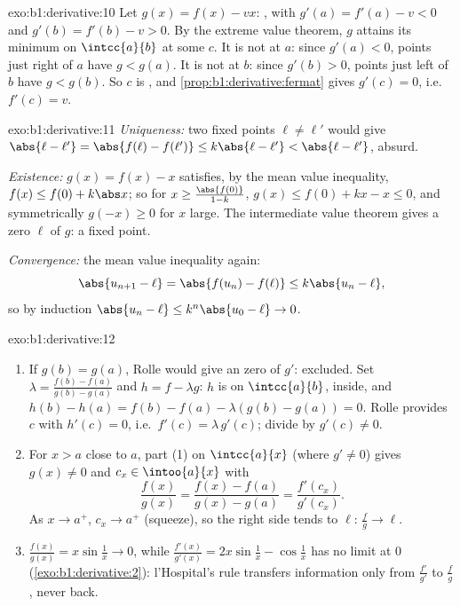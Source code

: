 \begin{solution}{exo:b1:derivative:10}
Let $g(x) = f(x) - vx$: , with $g'(a) = f'(a) - v < 0$
and $g'(b) = f'(b) - v > 0$. By the extreme value theorem, $g$
attains its minimum on $\intcc{a}{b}$ at some $c$. It is not at $a$:
since $g'(a) < 0$, points just right of $a$ have $g < g(a)$. It is
not at $b$: since $g'(b) > 0$, points just left of $b$ have $g <
g(b)$. So $c$ is , and \cref{prop:b1:derivative:fermat}
gives $g'(c) = 0$, i.e.\ $f'(c) = v$.
\end{solution}

\begin{solution}{exo:b1:derivative:11}
\emph{Uniqueness:} two fixed points $\ell \neq \ell'$ would give
$\abs{\ell - \ell'} = \abs{f(\ell) - f(\ell')} \leq k\abs{\ell -
\ell'} < \abs{\ell - \ell'}$, absurd.

\emph{Existence:} $g(x) = f(x) - x$ satisfies, by the mean value
inequality, $f(x) \leq f(0) + k\abs x$; so for $x \geq
\frac{\abs{f(0)}}{1 - k}$, $g(x) \leq f(0) + kx - x \leq 0$, and
symmetrically $g(-x) \geq 0$ for $x$ large. The intermediate value
theorem gives a zero $\ell$ of $g$: a fixed point.

\emph{Convergence:} the mean value inequality again:
\[
\abs{u_{n+1} - \ell} = \abs{f(u_n) - f(\ell)} \leq k\abs{u_n - \ell},
\]
so by induction $\abs{u_n - \ell} \leq k^n \abs{u_0 - \ell} \to 0$.
\end{solution}

\begin{solution}{exo:b1:derivative:12}
\begin{enumerate}
  \item If $g(b) = g(a)$, Rolle would give an  zero of
        $g'$: excluded. Set $\lambda = \frac{f(b) - f(a)}{g(b) -
        g(a)}$ and $h = f - \lambda g$: $h$ is  on
        $\intcc{a}{b}$,  inside, and $h(b) - h(a)
        = f(b) - f(a) - \lambda(g(b) - g(a)) = 0$. Rolle
        provides $c$ with $h'(c) = 0$, i.e.\ $f'(c) =
        \lambda\,g'(c)$; divide by $g'(c) \neq 0$.
  \item For $x > a$ close to $a$, part (1) on $\intcc{a}{x}$
        (where $g' \neq 0$) gives $g(x) \neq 0$ and $c_x \in
        \intoo{a}{x}$ with
        \[
        \frac{f(x)}{g(x)} = \frac{f(x) - f(a)}{g(x) - g(a)}
        = \frac{f'(c_x)}{g'(c_x)} .
        \]
        As $x \to a^+$, $c_x \to a^+$ (squeeze), so the right
        side tends to $\ell$: $\frac{f}{g} \to \ell$.
  \item $\frac{f(x)}{g(x)} = x\sin\frac1x \to 0$, while
        $\frac{f'(x)}{g'(x)} = 2x\sin\frac1x - \cos\frac1x$ has
        no limit at $0$ (\cref{exo:b1:derivative:2}):
        l'Hospital's rule transfers information only from
        $\frac{f'}{g'}$ to $\frac fg$, never back.
\end{enumerate}
\end{solution}

